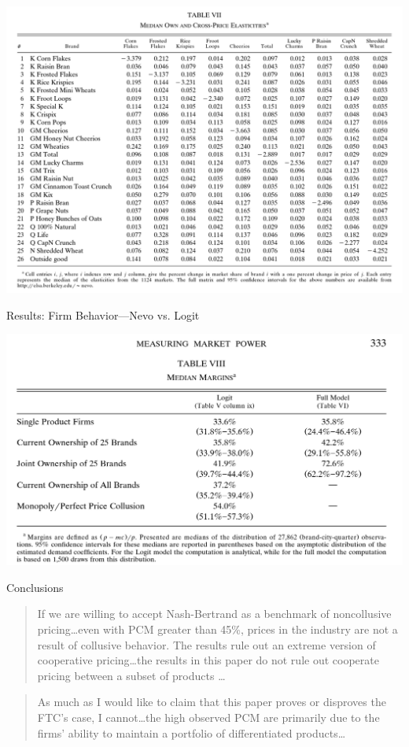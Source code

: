 \documentclass[dvipsnames]{beamer}
\begin{document}
   \begin{frame}{}
     \centering
     \includegraphics[width=\textwidth, keepaspectratio=true]{tab7.png}
   \end{frame}
   \begin{frame}{Results: Firm Behavior---Nevo vs. Logit}
     \begin{center}
      \includegraphics[width=\textwidth, keepaspectratio=true]{tab8.png} 
     \end{center}
   \end{frame}
   \begin{frame}{Conclusions}
     \begin{quote}
       If we are willing to accept Nash-Bertrand as a benchmark of noncollusive pricing\ldots even with PCM greater than 45\%, prices in the industry are not a result of collusive behavior. The results rule out an extreme version of cooperative pricing\ldots the results in this paper do not rule out cooperate pricing between a subset of products \ldots
     \end{quote}
    \vfill 
     \begin{quote}
       As much as I would like to claim that this paper proves or disproves the FTC's case, I cannot\ldots the high observed PCM are primarily due to the firms' ability to maintain a portfolio of differentiated products\ldots
     \end{quote}
   \end{frame}
\end{document}
